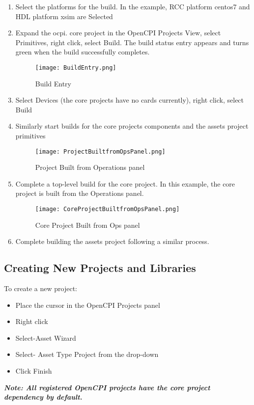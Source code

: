 \begin{enumerate}
\item	Select the platforms for the build. In the example, RCC platform centos7 and HDL platform xsim are Selected
\item	Expand the ocpi. core project in the OpenCPI Projects View, select Primitives, right click, select Build. The build status entry appears and turns green when the build successfully completes.
\begin{figure}[h!]
	\centering
	\caption{Build Entry}\label{fig:Build Entry}
	\texttt{[image: BuildEntry.png]}
 \end{figure}

\item Select Devices (the core projects have no cards currently), right click, select Build
\item Similarly start builds for the core projects components and the assets project primitives
\begin{figure}[h!]
	\centering
	\caption{Project Built from Operations panel}\label{fig:Project Built from Ops panel}
	\texttt{[image: ProjectBuiltfromOpsPanel.png]}
 \end{figure}

\item	Complete a top-level build for the core project. In this example, the core project is built from the Operations panel.
\begin{figure}[h!]
	\centering
	\caption{Core Project Built from Ops panel}\label{fig:Core Project Built from Ops panel}
	\texttt{[image: CoreProjectBuiltfromOpsPanel.png]}
 \end{figure}

\item	Complete building the assets project following a similar process.
\end{enumerate}

\subsection{Creating New Projects and Libraries}
To create a new project:
\begin{itemize}
\item	Place the cursor in the OpenCPI Projects panel
\item	Right click
\item Select-Asset Wizard
\item	Select- Asset Type Project from the drop-down
\item	Click Finish
\end{itemize}
\textbf{\emph{Note: All registered OpenCPI projects have the core project dependency by default.}}\\

